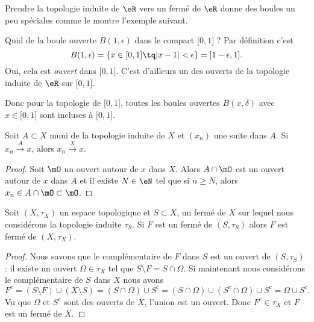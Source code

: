 Prendre la topologie induite de \( \eR\) vers un fermé de \( \eR\) donne des boules un peu spéciales comme le montre l'exemple suivant.

\begin{example}  \label{ExKYZwYxn}
    Quid de la boule ouverte \( B(1,\epsilon)\) dans le compact \( \mathopen[ 0 , 1 \mathclose]\) ? Par définition c'est
    \begin{equation}
        B(1,\epsilon)=\{ x\in\mathopen[ 0 , 1 \mathclose]\tq | x-1 |<\epsilon \}=\mathopen] 1-\epsilon , 1 \mathclose].
    \end{equation}
    Oui, cela est \emph{ouvert} dans \( \mathopen[ 0 , 1 \mathclose]\). C'est d'ailleurs un des ouverts de la topologie induite de \( \eR\) sur \( \mathopen[ 0 , 1 \mathclose]\).

    Donc pour la topologie de \( \mathopen[ 0 , 1 \mathclose]\), toutes les boules ouvertes \( B(x,\delta)\) avec \( x\in\mathopen[ 0 , 1 \mathclose]\) sont incluses à \( \mathopen[ 0 , 1 \mathclose]\).
\end{example}


\begin{lemma}   \label{LemPESaiVw}
    Soit \( A\subset X\) muni de la topologie induite de \( X\) et \( (x_n)\) une suite dans \( A\). Si \( x_n\stackrel{A}{\longrightarrow}x\), alors \( x_n\stackrel{X}{\longrightarrow}x\). 
\end{lemma}

\begin{proof}
    Soit \( \mO\) un ouvert autour de \( x\) dans \( X\). Alors \( A\cap\mO\) est un ouvert autour de \( x\) dans \( A\) et il existe \( N\in \eN\) tel que si \( n\geq N\), alors \( x_n\in A\cap\mO\subset\mO\).
\end{proof}

\begin{lemma}        \label{LemBWSUooCCGvax}
    Soit \( (X,\tau_X)\) un espace topologique et \( S\subset X\), un fermé de \( X\) sur lequel nous considérons la topologie induite \( \tau_S\). Si \( F\) est un fermé de \( (S,\tau_S)\) alors \( F\) est fermé de \( (X,\tau_X)\).
\end{lemma}

\begin{proof}
    Nous savons que le complémentaire de \( F\) dans \( S\) est un ouvert de \( (S,\tau_S)\) : il existe un ouvert \( \Omega\in \tau_X\) tel que \( S\setminus F=S\cap \Omega\). Si maintenant nous considérons le complémentaire de \( S\) dans \( X\) nous avons
    \begin{equation}
        F^c=(S\setminus F)\cup (X\setminus S)=(S\cap \Omega)\cup S^c=(S\cap \Omega)\cup(S^c\cap \Omega)\cup S^c=\Omega\cup S^c.
    \end{equation}
    Vu que \( \Omega\) et \( S^c\) sont des ouverts de \( X\), l'union est un ouvert. Donc \( F^c\in \tau_X\) et \( F\) est un fermé de \( X\).
\end{proof}

